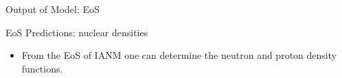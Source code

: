\documentclass[serif]{beamer}
\begin{document}
\begin{frame}{}
\begin{columns}[t]
\begin{column}{0.32\paperwidth}
\begin{block}{Output of Model: EoS}
\begin{itemize}
\end{itemize}
\end{block}
\begin{block}{EoS Predictions: nuclear densities}
\begin{itemize}
\item \alert{From the EoS of IANM one can determine the neutron and proton density functions}.
\begin{figure}[H]
\begin{center}
\hspace{5cm}

\end{center}
\end{figure}
\end{itemize}
\end{block}
\end{column}
\end{columns}
\end{frame}
\end{document}
